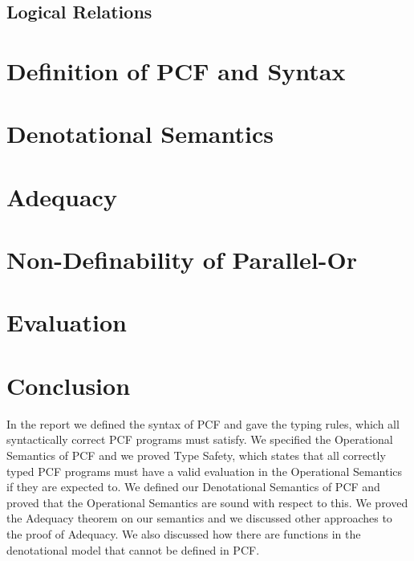\documentclass{bhamthesis}
\begin{document}


\section{Logical Relations}\label{log}



\chapter{Definition of PCF and Syntax}\label{ch3}




\chapter{Denotational Semantics}\label{ch6}


\chapter{Adequacy}\label{Adequacy}

%






\chapter{Non-Definability of Parallel-Or}\label{por}



\chapter{Evaluation}\label{ch9}



\chapter{Conclusion}\label{ch10}
In the report we defined the syntax of PCF and gave the typing rules, which all syntactically correct PCF programs must satisfy. We specified the Operational Semantics of PCF and we proved Type Safety, which states that all correctly typed PCF programs must have a valid evaluation in the Operational Semantics if they are expected to.
We defined our Denotational Semantics of PCF and proved that the Operational Semantics are sound with respect to this. We proved the Adequacy theorem on our semantics and we discussed other approaches to the proof of Adequacy. We also discussed how there are functions in the denotational model that cannot be defined in PCF.




\end{document}
